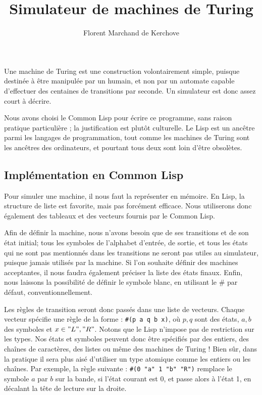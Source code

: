 \documentclass[a4paper, 10pt]{article}
\title{Simulateur de machines de Turing}
\author{Florent Marchand de Kerchove}
\begin{document}
\maketitle


Une machine de Turing est une construction volontairement simple,
puisque destinée à être manipulée par un humain, et non par un
automate capable d'effectuer des centaines de transitions par seconde.
Un simulateur est donc assez court à décrire.

Nous avons choisi le Common Lisp pour écrire ce programme, sans raison
pratique particulière ; la justification est plutôt culturelle.  Le
Lisp est un ancêtre parmi les langages de programmation, tout comme
les machines de Turing sont les ancêtres des ordinateurs, et pourtant
tous deux sont loin d'être obsolètes.

\subsection*{Implémentation en Common Lisp}

Pour simuler une machine, il nous faut la représenter en mémoire. En
Lisp, la structure de liste est favorite, mais pas forcément
efficace. Nous utiliserons donc également des tableaux et des vecteurs
fournis par le Common Lisp.

Afin de définir la machine, nous n'avons besoin que de ses transitions
et de son état initial; tous les symboles de l'alphabet d'entrée, de
sortie, et tous les états qui ne sont pas mentionnés dans les
transitions ne seront pas utiles au simulateur, puisque jamais
utilisés par la machine. Si l'on souhaite définir des machines
acceptantes, il nous faudra également préciser la liste des états
finaux. Enfin, nous laissons la possibilité de définir le symbole
blanc, en utilisant le \# par défaut, conventionnellement.

Les règles de transition seront donc passés dans une liste de
vecteurs. Chaque vecteur spécifie une règle de la forme :
\lstinline{#(p a q b x)}, où $p,q$ sont des états, $a,b$ des symboles
et $x \in {"L", "R"}$. Notons que le Lisp n'impose pas de restriction
sur les types. Nos états et symboles peuvent donc être spécifiés par
des entiers, des chaînes de caractères, des listes ou même des
machines de Turing !  Bien sûr, dans la pratique il sera plus aisé
d'utiliser un type atomique comme les entiers ou les chaînes. Par
exemple, la règle suivante : \lstinline{#(0 "a" 1 "b" "R")} remplace
le symbole $a$ par $b$ sur la bande, si l'état courant est 0, et passe
alors à l'état 1, en décalant la tête de lecture sur la droite.
\end{document}
